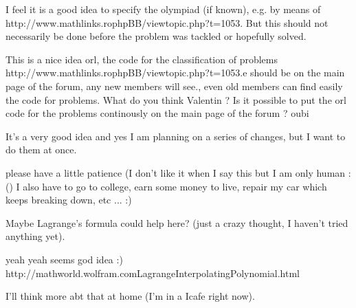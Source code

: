 \begin{solution}
	I feel it is a good idea to specify the olympiad (if known), e.g. by means of http://www.mathlinks.ro\/phpBB/viewtopic.php?t=1053. But this should not necessarily be done before the problem was tackled or hopefully solved.
\end{solution}



\begin{solution}
	This is a nice idea orl, the code for the classification of problems
http://www.mathlinks.ro\/phpBB/viewtopic.php?t=1053.e 
should be on the main page of the forum, any new members will see.,
even old members can find easily the code for problems.
What do you think Valentin ? Is it possible to put the orl code for the
problems continously on the main page of the forum ?
oubi
\end{solution}



\begin{solution}
	It's a very good idea and yes I am planning on a series of changes, but  I want to do them at once. 

please have a little patience (I don't like it when I say this but I am only human :() I also have to go to college, earn some money to live, repair my car which keeps breaking down, etc ... :)
\end{solution}



\begin{solution}
	Maybe Lagrange's formula could help here? (just a crazy thought, I haven't tried anything yet).
\end{solution}



\begin{solution}
	yeah yeah seems god idea  :) 
http://mathworld.wolfram.com\/LagrangeInterpolatingPolynomial.html
\end{solution}



\begin{solution}
	I'll think more abt that at home (I'm in a Icafe right now).
\end{solution}



